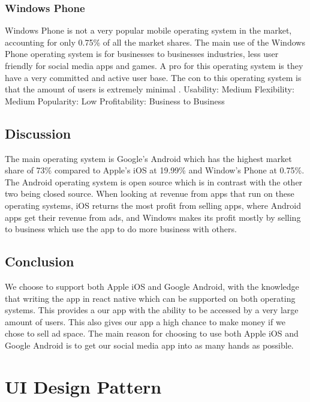 \documentclass[compsoc, 10, draftclsnofoot, onecolumn]{IEEEtran}
\begin{document}
\subsubsection{Windows Phone} 
\indent  Windows Phone is not a very popular mobile operating system in the market, accounting for only 0.75\% \cite{r1}of all the market shares. The main use of the Windows Phone operating system is for businesses to businesses industries, less user friendly for social media apps and games. A pro for this operating system is they have a very committed and active user base. The con to this operating system is that the amount of users is extremely minimal \cite{r2, r3}.    
\newline
Usability: Medium
\newline
Flexibility: Medium
\newline
Popularity: Low
\newline
Profitability: Business to Business
\newline
\newline
\subsection{Discussion} The main operating system is Google’s Android which has the highest market share of 73\% compared to Apple’s iOS at 19.99\% and Window’s Phone at 0.75\%\cite{r1}. The Android operating system is open source which is in contrast with the other two being closed source. When looking at revenue from apps that run on these operating systems, iOS returns the most profit from selling apps, where Android apps get their revenue from ads, and Windows makes its profit mostly by selling to business which use the app to do more business with others.  
\subsection{Conclusion} We choose to support both Apple iOS and Google Android, with the knowledge that writing the app in react native which can be supported on both operating systems. This provides a our app with the ability to be accessed by a very large amount of users. This also gives our app a high chance to make money if we chose to sell ad space. The main reason for choosing to use both Apple iOS and Google Android is to get our social media app into as many hands as possible. 
\section{\textbf{UI Design Pattern}}
\end{document}
